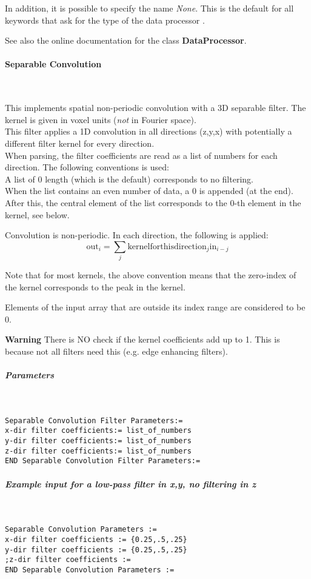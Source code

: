 \documentclass{article}
\newcommand{\tab}{\hspace{5mm}}
\newcommand{\subsubsubsection}[1]{\paragraph{#1}\mbox{} \\}
\newcommand{\subsubsubsubsection}[1]{\subparagraph{#1} \mbox{} \\}
\begin{document}
{In addition, it is possible to specify the name \textit{None}. This 
is the default for all keywords that ask for the type of 
the data processor .


See also the online documentation for the class \textbf{DataProcessor}.

{ \subsubsubsection{Separable Convolution}
}
This implements spatial non-periodic convolution with a 3D separable 
filter. The kernel is given in voxel units (\textit{not} in Fourier 
space).\\
This filter applies a 1D convolution in all directions (z,y,x) 
with potentially a different filter kernel for every direction.\\
When parsing, the filter coefficients are read as a list of numbers 
for each direction. The following conventions is used:\\
{\textbullet}\tab 
A list of 0 length (which is the default) corresponds to no filtering.\\
{\textbullet}\tab When the list contains an even number of data, a 0 is 
appended (at the end).\\
{\textbullet}\tab 
After this, the central element of the list corresponds to the 
0-th element in the kernel, see below.


Convolution is non-periodic. In each direction, the following 
is applied: 
\[
\mathrm{out}_i = \sum_{j} \mathrm{kernelforthisdirection}_{j} \mathrm{in}_{i-j}
\]

Note that for most kernels, the above convention means that the 
zero-index of the kernel corresponds to the peak in the kernel. 



Elements of the input array that are outside its index range 
are considered to be 0. 


\textbf{Warning} There is NO check if the kernel coefficients add 
up to 1. This is because not all filters need this (e.g. edge 
enhancing filters).

{ \subsubsubsubsection{Parameters}
}
\begin{verbatim}
Separable Convolution Filter Parameters:=
x-dir filter coefficients:= list_of_numbers
y-dir filter coefficients:= list_of_numbers
z-dir filter coefficients:= list_of_numbers
END Separable Convolution Filter Parameters:=
\end{verbatim}

{ \subsubsubsubsection{Example input for a low-pass filter in x,y, no filtering 
in z}
}
\begin{verbatim}
Separable Convolution Parameters := 
x-dir filter coefficients := {0.25,.5,.25} 
y-dir filter coefficients := {0.25,.5,.25} 
;z-dir filter coefficients :=
END Separable Convolution Parameters :=
\end{verbatim}

}
\end{document}
